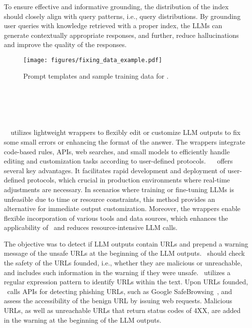 To ensure effective and informative grounding, 
the distribution of the index should closely align with query patterns, i.e., query distributions. 
By grounding user queries with knowledge retrieved with a proper index, 
the LLMs can generate contextually appropriate responses, and further, reduce hallucinations and improve the quality of the responses. 



\begin{figure*}
  \centering
  \texttt{[image: figures/fixing\_data\_example.pdf]}
  \caption{Prompt templates and sample training data for \fixing.}
  \label{fig: training_data_example_fixing}
\end{figure*}

\section{\goodname~\customization}\label{sec:customization}

\goodname~\customization~utilizes lightweight wrappers to flexibly edit or customize LLM outputs to fix some small errors or enhancing the format of the answer. The wrappers integrate code-based rules, APIs, web searches, and small models to efficiently handle editing and customization tasks according to user-defined protocols. \goodname~\customization~ offers several key advantages. It facilitates rapid development and deployment of user-defined protocols, which crucial in production environments where real-time adjustments are necessary. In scenarios where training or fine-tuning LLMs is unfeasible due to time or resource constraints, this method provides an alternative for immediate output customization. Moreover, the wrappers enable flexible incorporation  of various tools and data sources, which enhances the applicability of  \goodname~and reduces resource-intensive LLM calls. 



\begin{example}\label{example:waring_urls}
The objective was to detect if LLM outputs contain URLs and prepend a warning message of the unsafe URLs at the beginning of the LLM outputs. \customization~should check the safety of the URLs founded,  i.e., whether they are malicious or unreachable, and includes such information in the warning if they were unsafe.
\customization~utilizes a regular expression pattern 
to identify URLs within the text. Upon URLs founded, \customization~calls APIs for detecting phishing URLs, such as Google SafeBrowsing~\citep{google-safe-browsing}, and assess the accessibility of the benign URL by issuing web requests. Malicious URLs, as well as unreachable URLs that return status codes of 4XX, are added in the warning at the beginning of the LLM outputs.
\end{example}


